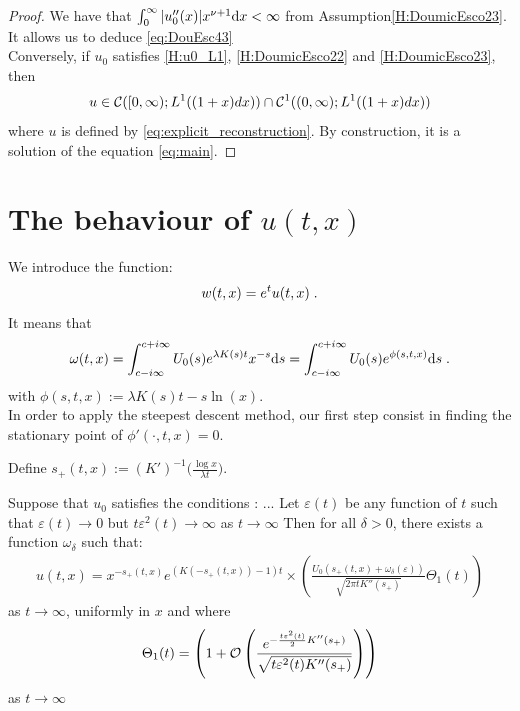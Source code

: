 \documentclass[11pt]{amsart}
\begin{document}
\begin{proof}
    We have that $\int_0^\infty |u_0''(x)| x^{\nu + 1} \mathrm dx < \infty$ from Assumption\eqref{H:DoumicEsco23}. It allows us to deduce \eqref{eq:DouEsc43} \\
    
    Conversely, if $u_0$ satisfies \eqref{H:u0_L1}, \eqref{H:DoumicEsco22} and \eqref{H:DoumicEsco23}, then 
     $$u \in \mathcal{C}([0, \infty); L^1((1+x)dx)) \cap \mathcal{C}^1((0, \infty); L^1((1+x)dx))$$
    where $u$ is defined by \eqref{eq:explicit_reconstruction}. By construction, it is a solution of the equation \eqref{eq:main}.
    \end{proof}

\section{The behaviour of $u(t,x)$}
We introduce the function: 
    \begin{align*}
        w(t,x) = e^t u(t,x)
        \; .
    \end{align*}
It means that
    \begin{equation*}
        \omega(t,x)
        = \int_{c-i\infty}^{c+i\infty} U_0(s) e^{\lambda K(s)t}x^{-s} \mathrm ds
        =  \int_{c-i\infty}^{c+i\infty} U_0(s) e^{\phi(s, t, x)} \mathrm ds
        \; .
    \end{equation*}
with $\phi(s,t,x) := \lambda K(s) t - s \ln(x) $.\\

In order to apply the steepest descent method, our first step consist in finding the stationary point of $\phi'(\cdot, t, x) = 0$. 

Define $ s_+(t,x) := (K')^{-1} \Big( \frac{\log x}{\lambda t} \Big)$.


\begin{theorem}
    Suppose that  $u_0$ satisfies the conditions : ...
    Let $\varepsilon(t)$ be any function of $t$ such that $\varepsilon(t) \to 0$ but $t\varepsilon^2(t) \to \infty$ as $t \to \infty$
Then for all $\delta > 0$, there exists a function $\omega_\delta$ such that:
\begin{equation*}
    \begin{split}
    u(t,x) = x^{-s_+(t,x)}e^{(K(-s_+(t,x))-1)t} \times 
    \left( \frac{U_0(s_+(t,x)+\omega_\delta(\varepsilon))}{\sqrt{2\pi tK''(s_+)}} \Theta_1(t)\right)
    \end{split}
\end{equation*}
as $t\to \infty$, uniformly in $x$ and where 
\begin{align*}
    \Theta_1(t) = \left(1 + \mathcal{O} \left( \frac{e^{-\frac{t\varepsilon^2(t)}{2}K''(s_+)}}{\sqrt{t\varepsilon^2(t)K''(s_+)}} \right) \right)
\end{align*}
as $t \to \infty$
\end{theorem}
\end{document}
